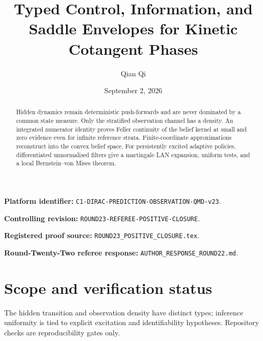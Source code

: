 \documentclass[11pt,reqno]{amsart}
\title[Controlled kinetic preparations]{Typed Control, Information, and Saddle Envelopes for Kinetic Cotangent Phases}
\author{Qian Qi}
\date{September 2, 2026}
\theoremstyle{definition}
\theoremstyle{remark}
\begin{document}
\raggedbottom
\begin{abstract}
Hidden dynamics remain deterministic push-forwards and are never dominated by
a common state measure.  Only the stratified observation channel has a
density.  An integrated numerator identity proves Feller continuity of the
belief kernel at small and zero evidence even for infinite reference strata.
Finite-coordinate approximations reconstruct into the convex belief space.
For persistently excited adaptive policies, differentiated unnormalised
filters give a martingale LAN expansion, uniform tests, and a local
Bernstein--von Mises theorem.
\end{abstract}
\maketitle
\noindent\textbf{Platform identifier:} \texttt{C1-DIRAC-PREDICTION-OBSERVATION-QMD-v23}.\par
\noindent\textbf{Controlling revision:} \texttt{ROUND23-REFEREE-POSITIVE-CLOSURE}.\par
\noindent\textbf{Registered proof source:} \texttt{ROUND23\_POSITIVE\_CLOSURE.tex}.\par
\noindent\textbf{Round-Twenty-Two referee response:} \texttt{AUTHOR\_RESPONSE\_ROUND22.md}.\par
\tableofcontents

\section*{Scope and verification status}
The hidden transition and observation density have distinct types; inference
uniformity is tied to explicit excitation and identifiability hypotheses.
Repository checks are reproducibility gates only.
\printbibliography
\end{document}
